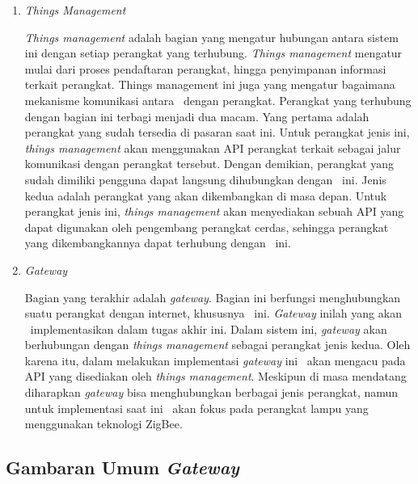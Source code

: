 \begin{enumerate}
	\item \textit{Things Management}
	
	\textit{Things management} adalah bagian yang mengatur hubungan antara sistem ini dengan setiap perangkat yang terhubung. \textit{Things management} mengatur mulai dari proses pendaftaran perangkat, hingga penyimpanan informasi terkait perangkat. Things management ini juga yang mengatur bagaimana mekanisme komunikasi antara \plat~dengan perangkat. Perangkat yang terhubung dengan bagian ini terbagi menjadi dua macam. Yang pertama adalah perangkat yang sudah tersedia di pasaran saat ini. Untuk perangkat jenis ini, \textit{things management} akan menggunakan API perangkat terkait sebagai jalur komunikasi dengan perangkat tersebut. Dengan demikian, perangkat yang sudah dimiliki pengguna dapat langsung dihubungkan dengan \plat~ini. Jenis kedua adalah perangkat yang akan dikembangkan di masa depan. Untuk perangkat jenis ini, \textit{things management} akan menyediakan sebuah API yang dapat digunakan oleh pengembang perangkat cerdas, sehingga perangkat yang dikembangkannya dapat terhubung dengan \plat~ini.
	
	\item \textit{Gateway}
	
	Bagian yang terakhir adalah \textit{gateway}. Bagian ini berfungsi menghubungkan suatu perangkat dengan internet, khususnya \plat~ini. \textit{Gateway} inilah yang akan \saya~implementasikan dalam tugas akhir ini. Dalam sistem ini, \textit{gateway} akan berhubungan dengan \textit{things management} sebagai perangkat jenis kedua. Oleh karena itu, dalam melakukan implementasi \textit{gateway} ini \saya~akan mengacu pada API yang disediakan oleh \textit{things management}. Meskipun di masa mendatang diharapkan \textit{gateway} bisa menghubungkan berbagai jenis perangkat, namun untuk implementasi saat ini \saya~akan fokus pada perangkat lampu yang menggunakan teknologi ZigBee.
	
\end{enumerate}

\subsection{Gambaran Umum \textit{Gateway}}
	
